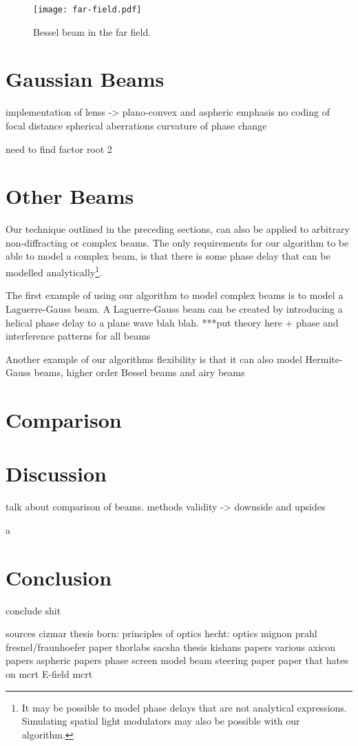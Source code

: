 \begin{figure}
\centering
\texttt{[image: far-field.pdf]}
\caption{Bessel beam in the far field.}
\label{fig:farfield}
\end{figure}
\section{Gaussian Beams}

implementation of lenss -> plano-convex and aspheric
emphasis no coding of focal distance
spherical aberrations 
curvature of phase change

need to find factor root 2

\section{Other Beams}

Our technique outlined in the preceding sections, can also be applied to arbitrary non-diffracting or complex beams. The only requirements for our algorithm to be able to model a complex beam, is that there is some phase delay that can be modelled analytically\footnote{It may be possible to model phase delays that are not analytical expressions. Simulating spatial light modulators may also be possible with our algorithm.}.

The first example of using our algorithm to model complex beams is to model a Laguerre-Gauss beam. A Laguerre-Gauss beam can be created by introducing a helical phase delay to a plane wave blah blah. ***put theory here + phase and interference patterns for all beams

Another example of our algorithms flexibility is that it can also model Hermite-Gauss beams, higher order Bessel beams and airy beams

\section{Comparison}

\section{Discussion}

talk about comparison of beams. methods validity -> downside and upsides

a~\cite{mignon2016fractional}
\section{Conclusion}

conclude shit


sources
cizmar thesis
born: principles of optics
hecht: optics
mignon
prahl
fresnel/fraunhoefer paper
thorlabs
sacsha thesis
kishans papers
various axicon papers
aspheric papers
phase screen model
beam steering paper
paper that hates on mcrt
E-field mcrt